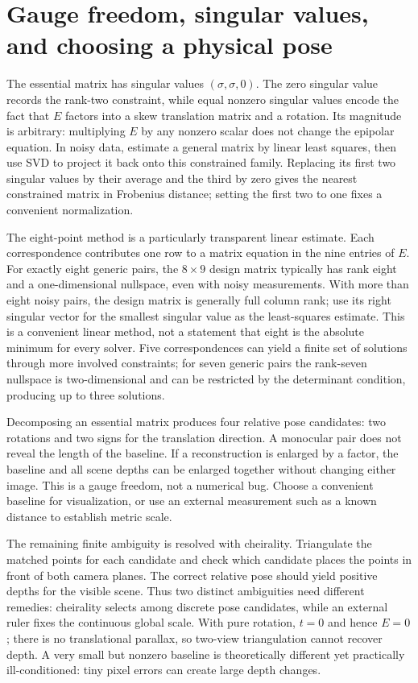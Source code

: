 \section{Gauge freedom, singular values, and choosing a physical pose}\label{02-foundations-ii-ch036-gauge-freedom-singular-values-and-choosing-a-physical-pose}

The essential matrix has singular values \((\sigma,\sigma,0)\). The zero singular value records the rank-two constraint, while equal nonzero singular values encode the fact that \(E\) factors into a skew translation matrix and a rotation. Its magnitude is arbitrary: multiplying \(E\) by any nonzero scalar does not change the epipolar equation. In noisy data, estimate a general matrix by linear least squares, then use SVD to project it back onto this constrained family. Replacing its first two singular values by their average and the third by zero gives the nearest constrained matrix in Frobenius distance; setting the first two to one fixes a convenient normalization.

The eight-point method is a particularly transparent linear estimate. Each correspondence contributes one row to a matrix equation in the nine entries of \(E\). For exactly eight generic pairs, the \(8\times9\) design matrix typically has rank eight and a one-dimensional nullspace, even with noisy measurements. With more than eight noisy pairs, the design matrix is generally full column rank; use its right singular vector for the smallest singular value as the least-squares estimate. This is a convenient linear method, not a statement that eight is the absolute minimum for every solver. Five correspondences can yield a finite set of solutions through more involved constraints; for seven generic pairs the rank-seven nullspace is two-dimensional and can be restricted by the determinant condition, producing up to three solutions.

Decomposing an essential matrix produces four relative pose candidates: two rotations and two signs for the translation direction. A monocular pair does not reveal the length of the baseline. If a reconstruction is enlarged by a factor, the baseline and all scene depths can be enlarged together without changing either image. This is a gauge freedom, not a numerical bug. Choose a convenient baseline for visualization, or use an external measurement such as a known distance to establish metric scale.

The remaining finite ambiguity is resolved with cheirality. Triangulate the matched points for each candidate and check which candidate places the points in front of both camera planes. The correct relative pose should yield positive depths for the visible scene. Thus two distinct ambiguities need different remedies: cheirality selects among discrete pose candidates, while an external ruler fixes the continuous global scale. With pure rotation, \(t=0\) and hence \(E=0\); there is no translational parallax, so two-view triangulation cannot recover depth. A very small but nonzero baseline is theoretically different yet practically ill-conditioned: tiny pixel errors can create large depth changes.

